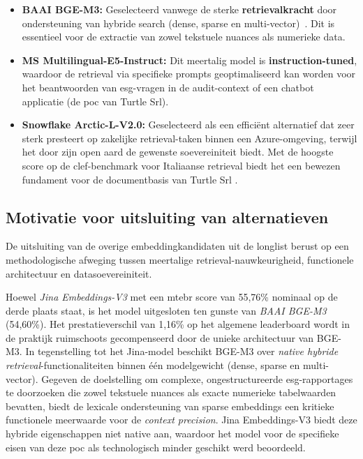 \begin{itemize}
    \item \textbf{BAAI BGE-M3:} Geselecteerd vanwege de sterke \textbf{retrievalkracht} door ondersteuning van hybride search (dense, sparse en multi-vector)~\autocite{Chen2024}. Dit is essentieel voor de extractie van zowel tekstuele nuances als numerieke data.
    \item \textbf{MS Multilingual-E5-Instruct:} Dit meertalig model is \textbf{instruction-tuned}, waardoor de retrieval via specifieke prompts geoptimaliseerd kan worden voor het beantwoorden van \gls{esg}-vragen in de audit-context of een chatbot applicatie (de \gls{poc} van Turtle Srl).
    \item \textbf{Snowflake Arctic-L-V2.0:} Geselecteerd als een efficiënt alternatief dat zeer sterk presteert op zakelijke retrieval-taken binnen een Azure-omgeving, terwijl het door zijn open aard de gewenste soevereiniteit biedt. Met de hoogste score op de \gls{clef}-benchmark voor Italiaanse retrieval biedt het een bewezen fundament voor de documentbasis van Turtle Srl \autocite{YuEtAl2024}.
\end{itemize}

\subsection{Motivatie voor uitsluiting van alternatieven}

De uitsluiting van de overige embeddingkandidaten uit de longlist berust op een methodologische afweging tussen meertalige retrieval-nauwkeurigheid, functionele architectuur en datasoevereiniteit. 

Hoewel \textit{Jina Embeddings-V3} met een \gls{mtebr} score van 55,76\% nominaal op de derde plaats staat, is het model uitgesloten ten gunste van \textit{BAAI BGE-M3} (54,60\%). Het prestatieverschil van 1,16\% op het algemene leaderboard wordt in de praktijk ruimschoots gecompenseerd door de unieke architectuur van BGE-M3. In tegenstelling tot het Jina-model beschikt BGE-M3 over \textit{native hybride retrieval}-functionaliteiten binnen één modelgewicht (dense, sparse en multi-vector). Gegeven de doelstelling om complexe, ongestructureerde \gls{esg}-rapportages te doorzoeken die zowel tekstuele nuances als exacte numerieke tabelwaarden bevatten, biedt de lexicale ondersteuning van sparse embeddings een kritieke functionele meerwaarde voor de \textit{context precision}. Jina Embeddings-V3 biedt deze hybride eigenschappen niet native aan, waardoor het model voor de specifieke eisen van deze \gls{poc} als technologisch minder geschikt werd beoordeeld.


